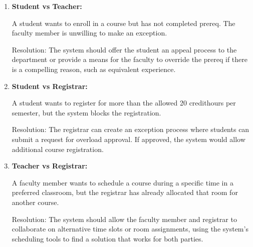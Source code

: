 \begin{enumerate}

\item{\textbf{Student vs Teacher:}}

A student wants to enroll in a course but has not completed \gls{prereq}. The faculty member is unwilling to make an exception.

Resolution: The system should offer the student an appeal process to the department or provide a means for the faculty to override the \gls{prereq} if there is a compelling reason, such as equivalent experience.

\item{\textbf{Student vs Registrar:}}

A student wants to register for more than the allowed 20 \gls{credithours} per semester, but the system blocks the registration.

Resolution: The registrar can create an exception process where students can submit a request for overload approval. If approved, the system would allow additional course registration.

\item{\textbf{Teacher vs Registrar:}}

A faculty member wants to schedule a course during a specific time in a preferred classroom, but the registrar has already \gls{allocate}d that room for another course.

Resolution: The system should allow the faculty member and registrar to collaborate on alternative time slots or room assignments, using the system's scheduling tools to find a solution that works for both parties.

\end{enumerate}




